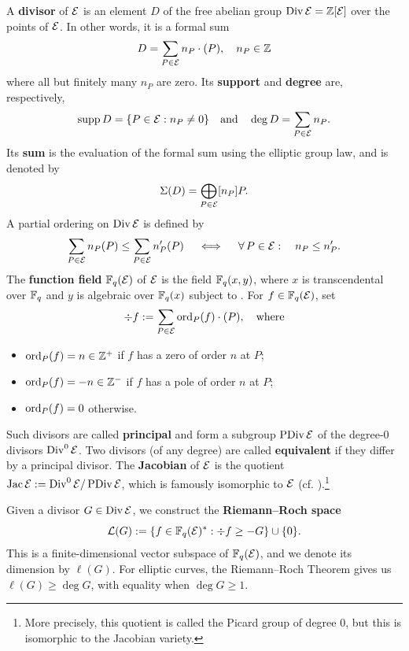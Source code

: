 \documentclass[twocolumn, 11pt]{scrartcl}
\begin{document}
A \textbf{divisor} of $\mathcal{E}$ is an element $D$ of the free abelian group $\operatorname{Div}\mathcal{E}=\mathbb{Z}[\mathcal{E}]$ over the points of $\mathcal{E}$. In other words, it is a formal sum
\[ D=\sum_{P\in\mathcal{E}} n_P\cdot(P),\quad n_P\in\mathbb{Z} \]
where all but finitely many $n_P$ are zero. Its \textbf{support} and \textbf{degree} are, respectively,
\[ \operatorname{supp} D=\{P\in\mathcal{E}:n_P\neq0\} \quad\text{and}\quad \deg D=\sum_{P\in\mathcal{E}} n_P. \]
Its \textbf{sum} is the evaluation of the formal sum using the elliptic group law, and is denoted by
\[ \Sigma(D)=\bigoplus_{P\in\mathcal{E}} [n_P]P. \]
A partial ordering on $\operatorname{Div}\mathcal{E}$ is defined by
\[ \sum_{P\in\mcE} n_P(P)\leq\sum_{P\in\mcE} n'_P(P) \qiff \forall P\in\mcE:\quad n_P\leq n'_P. \]
The \textbf{function field} $\mathbb{F}_q(\mathcal{E})$ of $\mathcal{E}$ is the field $\mathbb{F}_q(x,y)$, where $x$ is transcendental over $\mathbb{F}_q$ and $y$ is algebraic over $\mathbb{F}_q(x)$ subject to . For $f\in\mathbb{F}_q(\mathcal{E})$, set
\[ \div f:=\sum_{P\in\mathcal{E}} \operatorname{ord}_P(f)\cdot(P),\quad\text{where} \]
\begin{itemize}[itemsep=-8pt]
    \item $\operatorname{ord}_P(f)=n\in\mathbb{Z}^+$ if $f$ has a zero of order $n$ at $P$;
    \item $\operatorname{ord}_P(f)=-n\in\mathbb{Z}^-$ if $f$ has a pole of order $n$ at $P$;
    \item $\operatorname{ord}_P(f)=0$ otherwise.
\end{itemize}
Such divisors are called \textbf{principal} and form a subgroup $\operatorname{PDiv}\mathcal{E}$ of the degree-0 divisors $\operatorname{Div}^0\mathcal{E}$. Two divisors (of any degree) are called \textbf{equivalent} if they differ by a principal divisor. The \textbf{Jacobian} of $\mathcal{E}$ is the quotient $\operatorname{Jac}\mathcal{E}:=\operatorname{Div}^0\mathcal{E}/\operatorname{PDiv}\mathcal{E}$, which is famously isomorphic to $\mathcal{E}$ (cf. ).\footnote{More precisely, this quotient is called the Picard group of degree 0, but this is isomorphic to the Jacobian variety.}

Given a divisor $G\in\operatorname{Div}\mathcal{E}$, we construct the \textbf{Riemann--Roch space}
\[ \mathcal{L}(G):=\{f\in\mathbb{F}_q(\mathcal{E})^*:\div f\geq-G\}\cup\{0\}. \]
This is a finite-dimensional vector subspace of $\mathbb{F}_q(\mathcal{E})$, and we denote its dimension by $\ell(G)$. For elliptic curves, the Riemann--Roch Theorem \cite[\S1.5]{stichtenoth2009algebraic} gives us $\ell(G)\geq\deg G$, with equality when $\deg G\geq1$.
\end{document}
